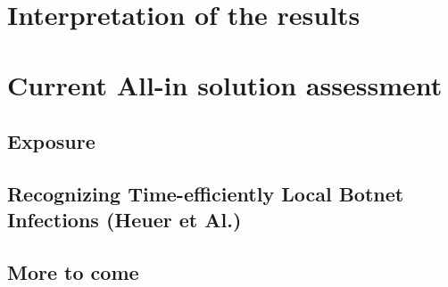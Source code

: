 \section{Interpretation of the results}

\section{Current All-in solution assessment}
\subsection{Exposure}
\subsection{Recognizing Time-efficiently Local Botnet Infections (Heuer et Al.)}
\subsection{More to come}
